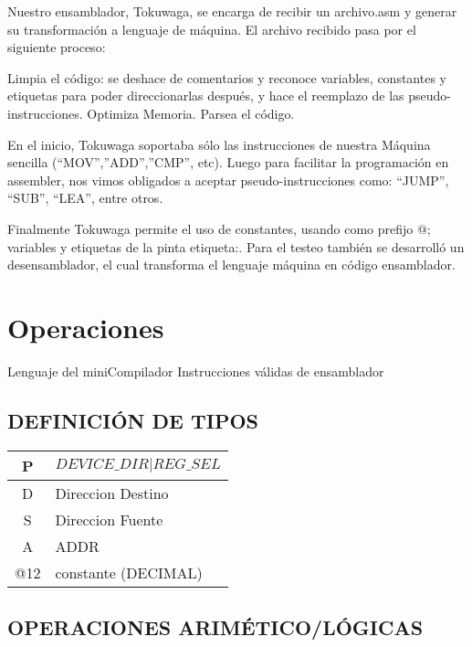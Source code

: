 \documentclass[12pt]{article}
\begin{document}
Nuestro ensamblador, Tokuwaga, se encarga de recibir un archivo.asm y generar su transformación a lenguaje de máquina. El archivo recibido pasa por  el siguiente proceso: 

Limpia el c\'odigo: se deshace de comentarios y reconoce variables, constantes y etiquetas para poder direccionarlas despu\'es, y hace el reemplazo de las pseudo-instrucciones. 
Optimiza Memoria. 
Parsea el c\'odigo.

En el inicio, Tokuwaga soportaba s\'olo las instrucciones de nuestra M\'aquina sencilla (“MOV”,”ADD”,”CMP”, etc). Luego para facilitar la programaci\'on en assembler, nos vimos obligados a aceptar pseudo-instrucciones como: “JUMP”, “SUB”, “LEA”, entre otros.

Finalmente Tokuwaga  permite el uso de constantes, usando como prefijo @; variables  y etiquetas de la pinta etiqueta:. Para el testeo tambi\'en se desarroll\'o un desensamblador, el cual transforma el lenguaje m\'aquina en c\'odigo ensamblador.

\section{Operaciones}
Lenguaje del miniCompilador
Instrucciones v\'alidas de ensamblador

\subsection{DEFINICI\'ON DE TIPOS}

\begin{tabular}{| c | l |}
\hline 
P & $DEVICE\_DIR|REG\_SEL$  \\ \hline
D & Direccion Destino  \\  \hline
S & Direccion Fuente \\ \hline
A & ADDR\\  \hline
@12 & constante (DECIMAL)\\\hline
\end{tabular}

\subsection{OPERACIONES ARIM\'ETICO/L\'OGICAS}     
\end{document}
